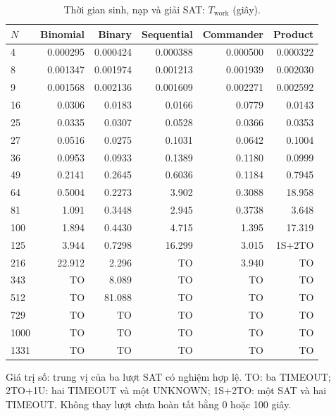 \begin{table}[pos=H]
\centering
\small
\caption{Thời gian sinh, nạp và giải SAT: $T_{\mathrm{work}}$ (giây).}
\label{tab:sat_work}
\setlength{\tabcolsep}{4pt}
\begin{tabular}{@{}lrrrrr@{}}
\toprule
$N$ & Binomial & Binary & Sequential & Commander & Product \\
\midrule
4 & 0.000295 & 0.000424 & 0.000388 & 0.000500 & 0.000322 \\
8 & 0.001347 & 0.001974 & 0.001213 & 0.001939 & 0.002030 \\
9 & 0.001568 & 0.002136 & 0.001609 & 0.002271 & 0.002592 \\
16 & 0.0306 & 0.0183 & 0.0166 & 0.0779 & 0.0143 \\
25 & 0.0335 & 0.0307 & 0.0528 & 0.0366 & 0.0353 \\
27 & 0.0516 & 0.0275 & 0.1031 & 0.0642 & 0.1004 \\
36 & 0.0953 & 0.0933 & 0.1389 & 0.1180 & 0.0999 \\
49 & 0.2141 & 0.2645 & 0.6036 & 0.1184 & 0.7945 \\
64 & 0.5004 & 0.2273 & 3.902 & 0.3088 & 18.958 \\
81 & 1.091 & 0.3448 & 2.945 & 0.3738 & 3.648 \\
100 & 1.894 & 0.4430 & 4.715 & 1.395 & 17.319 \\
125 & 3.944 & 0.7298 & 16.299 & 3.015 & 1S+2TO \\
216 & 22.912 & 2.296 & TO & 3.940 & TO \\
343 & TO & 8.089 & TO & TO & TO \\
512 & TO & 81.088 & TO & TO & TO \\
729 & TO & TO & TO & TO & TO \\
1000 & TO & TO & TO & TO & TO \\
1331 & TO & TO & TO & TO & TO \\
\bottomrule
\end{tabular}
\par\smallskip\begin{minipage}{\linewidth}\footnotesize Giá trị số: trung vị của ba lượt SAT có nghiệm hợp lệ. TO: ba TIMEOUT; 2TO+1U: hai TIMEOUT và một UNKNOWN; 1S+2TO: một SAT và hai TIMEOUT. Không thay lượt chưa hoàn tất bằng 0 hoặc 100 giây.\end{minipage}
\end{table}
